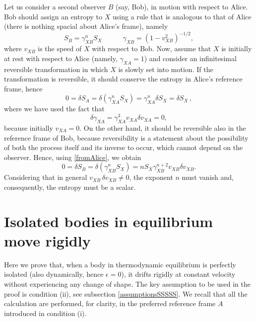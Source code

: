 \documentclass[twocolumn,usenatbib]{mnras2}
\newcommand{\spc}{\quad \quad \quad}
\begin{document}
Let us consider a second observer $B$ (say, Bob), in motion with respect to Alice. Bob should assign an entropy to $X$ using a rule that is analogous to that of Alice (there is nothing spacial about Alice's frame), namely
\begin{equation}
S_B = \gamma^n_{XB} S_X  \spc  \gamma_{XB}= (1-v_{XB}^2)^{-1/2},
\end{equation} 
where $v_{XB}$ is the speed of $X$ with respect to Bob. Now, assume that $X$ is initially at rest with respect to Alice (namely, $\gamma_{XA}=1$) and consider an infinitesimal reversible transformation in which $X$ is slowly set into motion. If the transformation is reversible, it should conserve the entropy in Alice's reference frame, hence
\begin{equation}\label{fromAlice}
0=\delta S_A = \delta (\gamma^n_{XA} S_X ) = \gamma^n_{XA} \delta S_X = \delta S_X \, ,
\end{equation}
where we have used the fact that
\begin{equation}
\delta \gamma_{XA} = \gamma_{XA}^3 v_{XA}\delta v_{XA} =0,
\end{equation}
because initially $v_{XA}=0$. On the other hand, it should be reversible also in the reference frame of Bob, because reversibility is a statement about the possibility of both the process itself and its inverse to occur, which cannot depend on the observer. Hence, using \eqref{fromAlice}, we obtain
\begin{equation}
0=\delta S_B = \delta (\gamma^n_{XB} S_X ) = n S_X \gamma^{n+2}_{XB} v_{XB} \delta v_{XB}.
\end{equation}
Considering that in general $ v_{XB} \, \delta v_{XB}\neq 0$, the exponent $n$ must vanish and, consequently, the entropy must be a scalar.



\section{Isolated bodies in equilibrium move rigidly}\label{Rigiduz}

Here we prove that, when a body in thermodynamic equilibrium is perfectly isolated (also dynamically, hence $\epsilon =0$), it drifts rigidly at constant velocity without experiencing any change of shape. The key assumption to be used in the proof is condition (ii), see subsection \ref{assumptionsSSSSS}. We recall that all the calculation are performed, for clarity, in the preferred reference frame $A$ introduced in condition (i).
\end{document}

